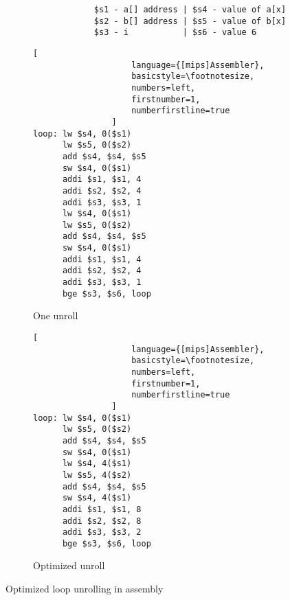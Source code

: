 \begin{figure}[h]
    \centering
    \begin{adjustbox}{minipage=\linewidth,scale=0.8}
        \centering
        \begin{verbatim}
                  $s1 - a[] address | $s4 - value of a[x]
                  $s2 - b[] address | $s5 - value of b[x]
                  $s3 - i           | $s6 - value 6
        \end{verbatim}
        \begin{subfigure}{.55\textwidth}
            \centering
            \begin{lstlisting}[
                    language={[mips]Assembler},
                    basicstyle=\footnotesize,
                    numbers=left,
                    firstnumber=1,
                    numberfirstline=true
                ]
loop: lw $s4, 0($s1)
      lw $s5, 0($s2)
      add $s4, $s4, $s5
      sw $s4, 0($s1)
      addi $s1, $s1, 4
      addi $s2, $s2, 4
      addi $s3, $s3, 1
      lw $s4, 0($s1)
      lw $s5, 0($s2)
      add $s4, $s4, $s5
      sw $s4, 0($s1)
      addi $s1, $s1, 4
      addi $s2, $s2, 4
      addi $s3, $s3, 1
      bge $s3, $s6, loop
                \end{lstlisting}
            \caption{One unroll}
            \label{fig:optimized:sub1}
        \end{subfigure}%
        \begin{subfigure}{.3\textwidth}
            \centering
            \begin{lstlisting}[
                    language={[mips]Assembler},
                    basicstyle=\footnotesize,
                    numbers=left,
                    firstnumber=1,
                    numberfirstline=true
                ]
loop: lw $s4, 0($s1)
      lw $s5, 0($s2)
      add $s4, $s4, $s5
      sw $s4, 0($s1)
      lw $s4, 4($s1)
      lw $s5, 4($s2)
      add $s4, $s4, $s5
      sw $s4, 4($s1)
      addi $s1, $s1, 8
      addi $s2, $s2, 8
      addi $s3, $s3, 2
      bge $s3, $s6, loop
                \end{lstlisting}
            \caption{Optimized unroll}
            \label{fig:optimized:sub2}
        \end{subfigure}
    \end{adjustbox}
    \caption{Optimized loop unrolling in assembly}
    \label{fig:assembly:optimized}
\end{figure}


